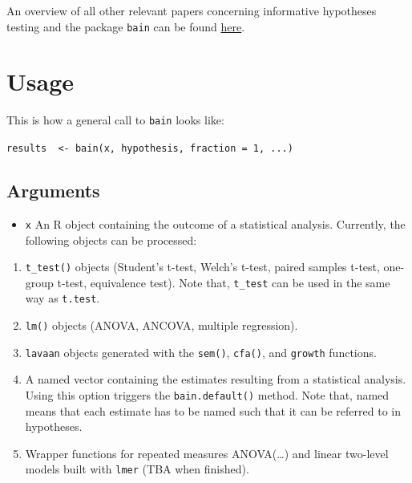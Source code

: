 \documentclass[
]{book}
\providecommand{\tightlist}{%
  \setlength{\itemsep}{0pt}\setlength{\parskip}{0pt}}
\begin{document}
An overview of all other relevant papers concerning informative hypotheses testing and the package \texttt{bain} can be found \href{https://informative-hypotheses.sites.uu.nl/publications/}{here}.

\hypertarget{usage}{%
\section{Usage}\label{usage}}

This is how a general call to \texttt{bain} looks like:

\texttt{results\ \ \textless{}-\ bain(x,\ hypothesis,\ fraction\ =\ 1,\ ...)}

\hypertarget{arguments}{%
\subsection{Arguments}\label{arguments}}

\begin{itemize}
\tightlist
\item
  \texttt{x}
  An R object containing the outcome of a statistical analysis. Currently, the following objects can be processed:
\end{itemize}

\begin{enumerate}
\def\labelenumi{\arabic{enumi})}
\tightlist
\item
  \texttt{t\_test()} objects (Student's t-test, Welch's t-test, paired samples t-test, one-group t-test, equivalence test). Note that, \texttt{t\_test} can be used in the same way as \texttt{t.test}.
\item
  \texttt{lm()} objects (ANOVA, ANCOVA, multiple regression).
\item
  \texttt{lavaan} objects generated with the \texttt{sem()}, \texttt{cfa()}, and
  \texttt{growth} functions.
\item
  A named vector containing the estimates resulting from a statistical analysis. Using this option triggers the \texttt{bain.default()} method. Note that, named means that each estimate has to be named such that it can be referred to in hypotheses.
\item
  Wrapper functions for repeated measures ANOVA(\ldots) and linear two-level models built with \texttt{lmer} (TBA when finished).
\end{enumerate}
\end{document}
